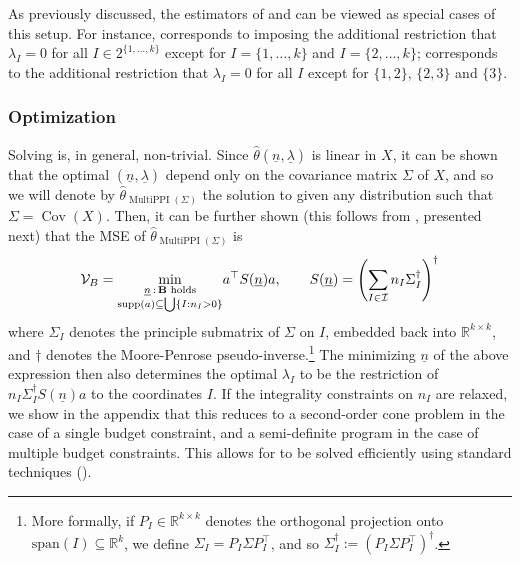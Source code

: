 \documentclass{article} %
\newcommand{\R}{\mathbb{R}}
\DeclareMathOperator{\Cov}{Cov}
\DeclareMathOperator{\multiPPI}{MultiPPI}
\DeclareMathOperator{\supp}{supp}
\newcommand{\ul}[1]{\underline{#1}}
\begin{document}
As previously discussed, the estimators of  and  can be viewed as special cases of this setup. For instance,  corresponds to imposing the additional restriction that $\lambda_I=0$ for all $I\in 2^{\{1,\dots,k\}}$ except for $I=\{1,\dots,k\}$ and $I=\{2,\dots,k\}$;  corresponds to the additional restriction that $\lambda_I=0$ for all $I$ except for $\{1,2\}$, $\{2,3\}$ and $\{3\}$.

\subsubsection{Optimization}
Solving  is, in general, non-trivial. Since $\hat{\theta}(\ul{n},\ul{\lambda})$ is linear in $X$, it can be shown that the optimal $(\ul{n},\ul{\lambda})$ depend only on the covariance matrix $\Sigma$ of $X$, and so we will denote by $\hat{\theta}_{\multiPPI(\Sigma)}$ the solution to  given any distribution such that $\Sigma=\Cov(X)$. Then, it can be further shown (this follows from , presented next) that the MSE of $\hat{\theta}_{\multiPPI(\Sigma)}$ is
\begin{equation}
    \label{eq:variance}
    \mathcal{V}_B=\underset{\substack{\ul{n}\,:\,\text{\textbf{B} holds} \\ \supp(a)\subseteq\bigcup\{I:n_I>0\}}}{\min} a^\top S(\ul{n}) a,\quad\quad S(\ul{n})=\left(\sum_{I\in\mathcal{I}} n_I \Sigma_I^\dagger\right)^\dagger
\end{equation}
where $\Sigma_I$ denotes the principle submatrix of $\Sigma$ on $I$, embedded back into $\R^{k\times k}$, and $\dagger$ denotes the Moore-Penrose pseudo-inverse.\footnote{More formally, if $P_I\in\R^{k\times k}$ denotes the orthogonal projection onto $\text{span}(I)\subseteq\R^k$, we define $\Sigma_I=P_I\Sigma P_I^\top$, and so $\Sigma_I^\dagger := (P_I\Sigma P_I^\top)^\dagger$.}
%
The minimizing $\ul{n}$ of the above expression then also determines the optimal $\lambda_I$ to be the restriction of $n_I\Sigma_I^\dagger S(\ul{n})a$ to the coordinates $I$. If the integrality constraints on $n_I$ are relaxed, we show in the appendix that this reduces to a second-order cone problem in the case of a single budget constraint, and a semi-definite program in the case of multiple budget constraints. This allows for   to be solved efficiently using standard techniques (). %
\end{document}
